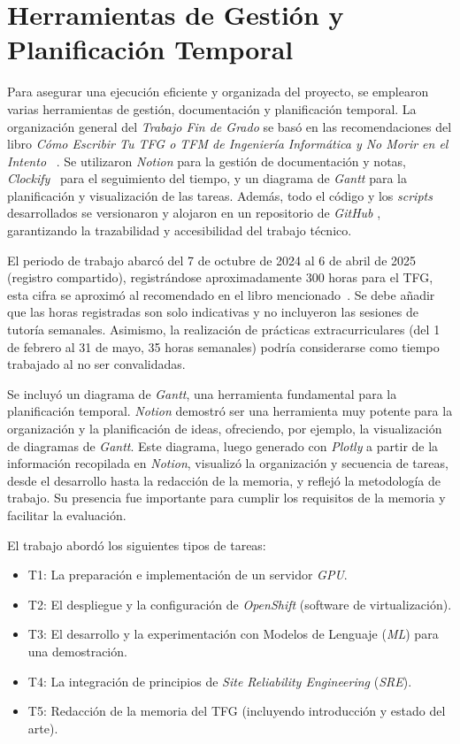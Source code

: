 \section{Herramientas de Gestión y Planificación Temporal}
Para asegurar una ejecución eficiente y organizada del proyecto, se emplearon varias herramientas de gestión, documentación y planificación temporal. La organización general del \textit{Trabajo Fin de Grado} se basó en las recomendaciones del libro \textit{Cómo Escribir Tu TFG o TFM de Ingeniería Informática y No Morir en el Intento} ~\cite{ref34}. Se utilizaron \textit{Notion} para la gestión de documentación y notas, \textit{Clockify}~\cite{ref35} para el seguimiento del tiempo, y un diagrama de \textit{Gantt} para la planificación y visualización de las tareas. Además, todo el código y los \textit{scripts} desarrollados se versionaron y alojaron en un repositorio de \textit{GitHub} \cite{ref17} , garantizando la trazabilidad y accesibilidad del trabajo técnico.

El periodo de trabajo abarcó del 7 de octubre de 2024 al 6 de abril de 2025~\cite{ref31} (registro compartido), registrándose aproximadamente 300 horas para el TFG, esta cifra se aproximó al recomendado en el libro mencionado~\cite{ref34}. Se debe añadir que las horas registradas son solo indicativas y no incluyeron las sesiones de tutoría semanales. Asimismo, la realización de prácticas extracurriculares (del 1 de febrero al 31 de mayo, 35 horas semanales) podría considerarse como tiempo trabajado al no ser convalidadas.

Se incluyó un diagrama de \textit{Gantt}, una herramienta fundamental para la planificación temporal. \textit{Notion} demostró ser una herramienta muy potente para la organización y la planificación de ideas, ofreciendo, por ejemplo, la visualización de diagramas de \textit{Gantt}. Este diagrama, luego generado con \textit{Plotly} a partir de la información recopilada en \textit{Notion}, visualizó la organización y secuencia de tareas, desde el desarrollo hasta la redacción de la memoria, y reflejó la metodología de trabajo. Su presencia fue importante para cumplir los requisitos de la memoria y facilitar la evaluación.

\noindent El trabajo abordó los siguientes tipos de tareas:
\begin{itemize}
    \item T1: La preparación e implementación de un servidor \textit{GPU}.
    \item T2: El despliegue y la configuración de \textit{OpenShift} (software de virtualización).
    \item T3: El desarrollo y la experimentación con Modelos de Lenguaje (\textit{ML}) para una demostración.
    \item T4: La integración de principios de \textit{Site Reliability Engineering} (\textit{SRE}).
     \item T5: Redacción de la memoria del TFG (incluyendo introducción y estado del arte).
\end{itemize}

